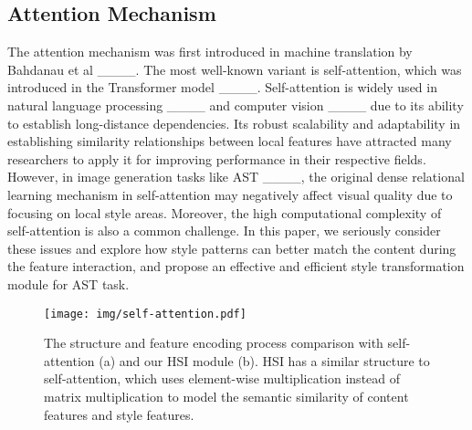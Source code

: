 \subsection{Attention Mechanism}
The attention mechanism was first introduced in machine translation by Bahdanau et al ____. The most well-known variant is self-attention, which was introduced in the Transformer model ____. Self-attention is widely used in natural language processing ____ and computer vision ____ due to its ability to establish long-distance dependencies. 
Its robust scalability and adaptability in establishing similarity relationships between local features have attracted many researchers to apply it for improving performance in their respective fields.
However, in image generation tasks like AST ____, 
the original dense relational learning mechanism in self-attention may negatively affect visual quality due to focusing on local style areas.
Moreover, the high computational complexity of self-attention is also a common challenge. 
In this paper, we seriously consider these issues and explore how style patterns can better match the content during the feature interaction, and propose an effective and efficient style transformation module for AST task.


\begin{figure*} [t!]
\centering
\setlength{\abovecaptionskip}{-0.3cm}
\texttt{[image: img/self-attention.pdf]}
\caption{The structure and feature encoding process comparison with self-attention (a) and our HSI module (b). HSI has a similar structure to self-attention, which uses element-wise multiplication instead of matrix multiplication to model the semantic similarity of content features and style features.}
\label{self_att}
\vspace{-0.5cm}
\end{figure*}